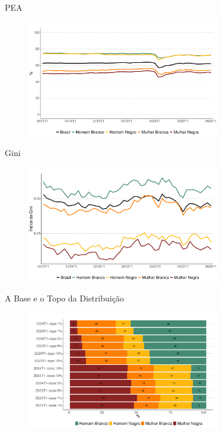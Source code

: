 \documentclass[10pt, xcolor=x11names,compress]{beamer}
\begin{document}
	\begin{frame}{PEA}
		\begin{figure}
			\centering
			\includegraphics[width = 0.75\textwidth]{figures_output/pea_br_gen_raca.pdf}
		\end{figure}
	\end{frame}	
	
	
	\begin{frame}{Gini}
		\begin{figure}
			\centering
			\includegraphics[width = 0.75\textwidth]{figures_output/gini_br_gen_raca.pdf}
		\end{figure}
	\end{frame}
	
	\begin{frame}{A Base e o Topo da Distribuição}
		\begin{figure}
			\centering
			\includegraphics[width = 0.75\textwidth]{figures_output/top_bottom.pdf}
		\end{figure}
	\end{frame}
	
\end{document}
